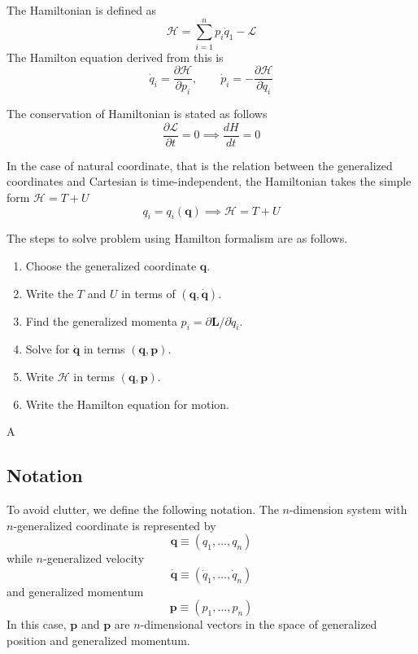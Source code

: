 \documentclass[../../../main.tex]{subfiles}
\begin{document}
The Hamiltonian is defined as
\begin{equation*}
	\mathcal{H}=\sum_{i=1}^{n}p_i\dot{q}_1-\mathcal{L}
\end{equation*}
The Hamilton equation derived from this is
\begin{equation*}
	\dot{q}_i=\frac{\partial\mathcal{H}}{\partial p_i},\qquad\dot{p}_i=-\frac{\partial\mathcal{H}}{\partial \dot{q}_i}
\end{equation*}

The conservation of Hamiltonian is stated as follows
\begin{equation*}
	\frac{\partial\mathcal{L}}{\partial t}=0\implies\frac{dH}{dt}=0
\end{equation*}

In the case of natural coordinate, that is the relation between the generalized coordinates and Cartesian is time-independent, the Hamiltonian takes the simple form $\mathcal{H}=T+U$
\begin{equation*}
	q_i=q_i(\mathbf{q})\implies\mathcal{H}=T+U
\end{equation*}

The steps to solve problem using Hamilton formalism are as follows.
\begin{enumerate}
    \item Choose the generalized coordinate $\mathbf{q}$.
    \item Write the $T$ and $U$ in terms of $(\mathbf{q},\dot{\mathbf{q}})$.
    \item Find the generalized momenta $p_i=\partial\mathbf{L}/\partial \dot{q}_i$.
    \item Solve for $\dot{\mathbf{q}}$ in terms $(\mathbf{q},\mathbf{p})$.
    \item Write $\mathcal{H}$ in terms $(\mathbf{q},\mathbf{p})$.
    \item Write the Hamilton equation for motion.
\end{enumerate}A

\subsection*{Notation}
To avoid clutter, we define the following notation.
The $n$-dimension system with $n$-generalized coordinate is represented by
\begin{equation*}
	\mathbf{q}\equiv(q_1,\dots,q_n)
\end{equation*}
while $n$-generalized velocity
\begin{equation*}
	\dot{\mathbf{q}}\equiv(\dot{q}_1,\dots,\dot{q}_n)
\end{equation*}
and generalized momentum
\begin{equation*}
	\mathbf{p}\equiv(p_1,\dots,p_n)
\end{equation*}
In this case, $\mathbf{p}$ and $\mathbf{p}$ are $n$-dimensional vectors in the space of generalized position and generalized momentum.
\end{document}
